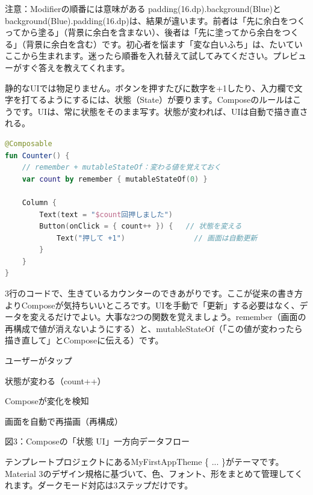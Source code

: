 \begin{tcbwarn}{注意：Modifierの順番には意味がある}
padding(16.dp).background(Blue)とbackground(Blue).padding(16.dp)は、結果が違います。前者は「先に余白をつくってから塗る」（背景に余白を含まない）、後者は「先に塗ってから余白をつくる」（背景に余白を含む）です。初心者を悩ます「変な白いふち」は、たいていここから生まれます。迷ったら順番を入れ替えて試してみてください。プレビューがすぐ答えを教えてくれます。

\end{tcbwarn}


静的なUIでは物足りません。ボタンを押すたびに数字を+1したり、入力欄で文字を打てるようにするには、状態（State）が要ります。Composeのルールはこうです。UIは、常に状態をそのまま写す。状態が変われば、UIは自動で描き直される。

\begin{lstlisting}[language=Kotlin]
@Composable
fun Counter() {
    // remember + mutableStateOf：変わる値を覚えておく
    var count by remember { mutableStateOf(0) }

    Column {
        Text(text = "$count回押しました")
        Button(onClick = { count++ }) {   // 状態を変える
            Text("押して +1")                // 画面は自動更新
        }
    }
}
\end{lstlisting}

3行のコードで、生きているカウンターのできあがりです。ここが従来の書き方よりComposeが気持ちいいところです。UIを手動で「更新」する必要はなく、データを変えるだけでよい。大事な2つの関数を覚えましょう。remember（画面の再構成で値が消えないようにする）と、mutableStateOf（「この値が変わったら描き直して」とComposeに伝える）です。

ユーザーがタップ

状態が変わる（count++）

Composeが変化を検知

画面を自動で再描画（再構成）

\begin{center}\small\color{gray}図3：Composeの「状態 UI」一方向データフロー\end{center}


テンプレートプロジェクトにあるMyFirstAppTheme \{ ... \}がテーマです。Material 3のデザイン規格に基づいて、色、フォント、形をまとめて管理してくれます。ダークモード対応は3ステップだけです。

